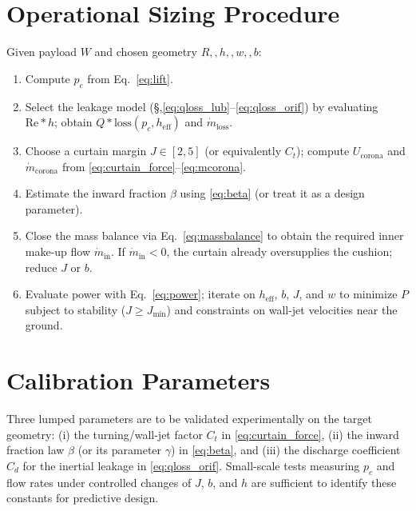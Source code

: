 \documentclass[11pt,a4paper]{article}
\begin{document}
\section{Operational Sizing Procedure}
Given payload $W$ and chosen geometry $R,,h,,w,,b$:
\begin{enumerate}
\item Compute $p_c$ from Eq.~\eqref{eq:lift}.
\item Select the leakage model (\S,\ref{eq:qloss_lub}--\ref{eq:qloss_orif}) by evaluating $\mathrm{Re}*h$; obtain $Q*{\mathrm{loss}}(p_c,h_{\mathrm{eff}})$ and $\dot m_{\mathrm{loss}}$.
\item Choose a curtain margin $J\in[2,5]$ (or equivalently $C_t$); compute $U_{\mathrm{corona}}$ and $\dot m_{\mathrm{corona}}$ from \eqref{eq:curtain_force}--\eqref{eq:mcorona}.
\item Estimate the inward fraction $\beta$ using \eqref{eq:beta} (or treat it as a design parameter).
\item Close the mass balance via Eq.~\eqref{eq:massbalance} to obtain the required inner make-up flow $\dot m_{\mathrm{in}}$. If $\dot m_{\mathrm{in}}<0$, the curtain already oversupplies the cushion; reduce $J$ or $b$.
\item Evaluate power with Eq.~\eqref{eq:power}; iterate on $h_{\mathrm{eff}}$, $b$, $J$, and $w$ to minimize $P$ subject to stability ($J\ge J_{\min}$) and constraints on wall-jet velocities near the ground.
\end{enumerate}

\section{Calibration Parameters}
Three lumped parameters are to be validated experimentally on the target geometry: (i) the turning/wall-jet factor $C_t$ in \eqref{eq:curtain_force}, (ii) the inward fraction law $\beta$ (or its parameter $\gamma$) in \eqref{eq:beta}, and (iii) the discharge coefficient $C_d$ for the inertial leakage in \eqref{eq:qloss_orif}. Small-scale tests measuring $p_c$ and flow rates under controlled changes of $J$, $b$, and $h$ are sufficient to identify these constants for predictive design.
\end{document}
